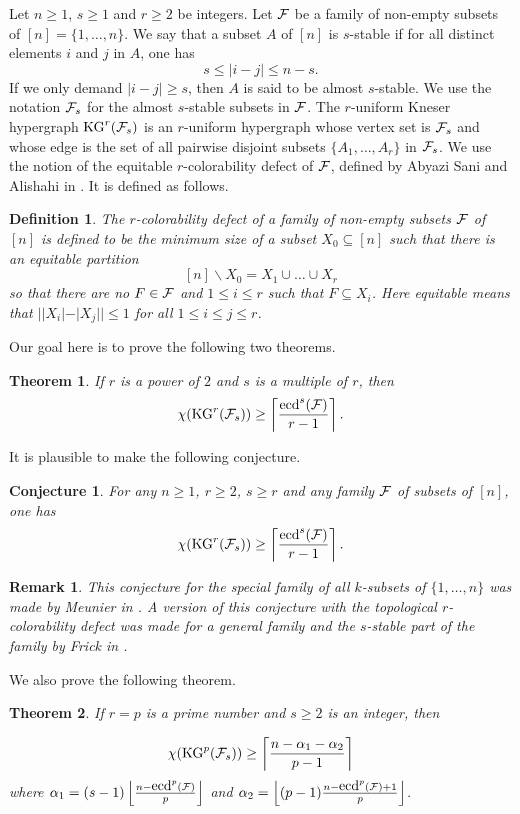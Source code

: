 \documentclass[a4paper,11pt]{article}
\newtheorem{definition}{Definition}[section]
\newtheorem{theorem}{Theorem}[section]
\newtheorem{conjecture}{Conjecture}[section]
\newtheorem{remark}{Remark}[section]
\begin{document}
Let $n\ge 1$, $s\ge 1$ and $r\ge 2$ be integers. Let $\cal F$ be a family of non-empty subsets of $[n]=\{1,\dots, n\}$. We say that a subset $A$ of $[n]$ is $s$-stable if for all distinct elements $i$ and $j$ in $A$, one has
$$s\le |i-j|\le n-s.$$
If we only demand $|i-j|\ge s$, then $A$ is said to be almost $s$-stable. We use the notation ${\cal F}_s$ for the almost $s$-stable subsets in $\cal F$. The $r$-uniform Kneser hypergraph $\mbox{KG}^r({\cal F}_s)$ is an $r$-uniform hypergraph whose vertex set is ${\cal F}_{s}$ and whose edge is the set of all pairwise disjoint subsets $\{A_1,\dots, A_r\}$ in ${\cal F}_s$.
We use the notion of the equitable $r$-colorability defect of $\cal F$, defined by Abyazi Sani and Alishahi in \cite{AA}. It is defined as follows.
\begin{definition}
The $r$-colorability defect of a family of non-empty subsets $\cal F$ of $[n]$ is defined to be the minimum size of a subset $X_0\subseteq [n]$ such that there is an equitable partition 
$$[n]\backslash X_0=X_1\cup\dots\cup X_r$$
so that there are no $F\in {\cal F}$ and $1\le i\le r$ such that $F\subseteq X_i$. Here equitable means that $||X_i|-|X_j||\le 1$ for all $1\le i\le j\le r$.
\end{definition}
Our goal here is to prove the following two theorems.
\begin{theorem}\label{thm1}
If $r$ is a power of $2$ and $s$ is a multiple of $r$, then 
\[\chi(\mbox{KG}^r({\cal F}_s))\ge \left\lceil \frac{\mbox{ecd}^s({\cal F})}{r-1}\right\rceil.\]
\end{theorem}
It is plausible to make the following conjecture.
\begin{conjecture}\label{conj}
For any $n\ge 1$, $r\ge 2$, $s\ge r$ and any family $\cal F$ of subsets of $[n]$, one has
\[\chi(\mbox{KG}^r({\cal F}_s))\ge \left\lceil \frac{\mbox{ecd}^s({\cal F})}{r-1}\right\rceil.\]
\end{conjecture}
\begin{remark} This conjecture for the special family of all $k$-subsets of $\{1,\dots, n\}$ was made by Meunier in \cite{M}. A version of this conjecture with the topological $r$-colorability defect was made for a general family and the $s$-stable part of the family by Frick in \cite{F}. 
\end{remark}
\noindent
We also prove the following theorem.
\begin{theorem}\label{thm2}
If $r=p$ is a prime number and $s\ge 2$ is an integer, then 

\[\chi(\mbox{KG}^p({\cal F}_{s}))\ge \left\lceil \frac{n-\alpha_1-\alpha_2}{p-1}\right\rceil\]
where $\alpha_1=(s-1)\left\lfloor \frac{n-\mbox{ecd}^p({\cal F})}{p}\right\rfloor$ and $\alpha_2=\left\lfloor (p-1)\frac{n-\mbox{ecd}^p({\cal F})+1}{p}\right\rfloor$.
\end{theorem}
\end{document}
